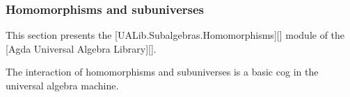 \subsubsection{Homomorphisms and
subuniverses}\label{homomorphisms-and-subuniverses}

This section presents the {[}UALib.Subalgebras.Homomorphisms{]}{[}{]}
module of the {[}Agda Universal Algebra Library{]}{[}{]}.

The interaction of homomorphisms and subuniverses is a basic cog in the
universal algebra machine.

\begin{code}%
\>[0]\<%
\\
\>[0]\AgdaSymbol{\{-\#}\AgdaSpace{}%
\AgdaSpace{}%
\AgdaSpace{}%
\AgdaSpace{}%
\AgdaSpace{}%
\AgdaSymbol{\#-\}}\<%
\\
%
\\[\AgdaEmptyExtraSkip]%
\>[0]\AgdaSpace{}%
\AgdaSpace{}%
\AgdaSpace{}%
\AgdaSpace{}%
\AgdaSymbol{(}\AgdaSymbol{;}\AgdaSpace{}%
\AgdaSymbol{;}\AgdaSpace{}%
\AgdaSymbol{;}\AgdaSpace{}%
\AgdaSymbol{;}\AgdaSpace{}%
\AgdaSymbol{)}\<%
\\
\>[0]\AgdaSpace{}%
\AgdaSpace{}%
\AgdaSpace{}%
\AgdaSpace{}%
\AgdaSymbol{(}\AgdaSymbol{;}\AgdaSpace{}%
\AgdaSymbol{;}\AgdaSpace{}%
\AgdaSymbol{)}\<%
\\
%
\\[\AgdaEmptyExtraSkip]%
%
\\[\AgdaEmptyExtraSkip]%
\>[0]\AgdaSpace{}%
\<%
\\
\>[0][@{}l@{\AgdaIndent{0}}]%
\>[1]\AgdaSymbol{\{}\AgdaSpace{}%
\AgdaSymbol{:}\AgdaSpace{}%
\AgdaSpace{}%
\AgdaSpace{}%
\AgdaSymbol{\}\{}\AgdaSpace{}%
\AgdaSymbol{:}\AgdaSpace{}%
\AgdaSymbol{\}}\<%
\\
%
\>[1]\AgdaSymbol{\{}\AgdaSpace{}%
\AgdaSymbol{:}\AgdaSpace{}%
\AgdaSymbol{\{}\AgdaSpace{}%

\end{code}
